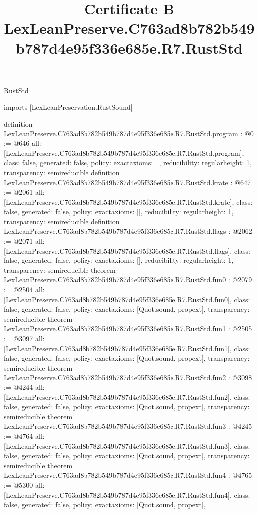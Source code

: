 \begin{lexlean}{RustStd}
\title{Certificate B LexLeanPreserve.C763ad8b782b549b787d4e95f336e685e.R7.RustStd}
\begin{coremodule}
imports [LexLeanPreservation.RustSound]

definition LexLeanPreserve.C763ad8b782b549b787d4e95f336e685e.R7.RustStd.program : @0 := @646 {
  all: [LexLeanPreserve.C763ad8b782b549b787d4e95f336e685e.R7.RustStd.program],
  class: false,
  generated: false,
  policy: exact{axioms: []},
  reducibility: regular{height: 1},
  transparency: semireducible
}
definition LexLeanPreserve.C763ad8b782b549b787d4e95f336e685e.R7.RustStd.krate : @647 := @2061 {
  all: [LexLeanPreserve.C763ad8b782b549b787d4e95f336e685e.R7.RustStd.krate],
  class: false,
  generated: false,
  policy: exact{axioms: []},
  reducibility: regular{height: 1},
  transparency: semireducible
}
definition LexLeanPreserve.C763ad8b782b549b787d4e95f336e685e.R7.RustStd.flags : @2062 := @2071 {
  all: [LexLeanPreserve.C763ad8b782b549b787d4e95f336e685e.R7.RustStd.flags],
  class: false,
  generated: false,
  policy: exact{axioms: []},
  reducibility: regular{height: 1},
  transparency: semireducible
}
theorem LexLeanPreserve.C763ad8b782b549b787d4e95f336e685e.R7.RustStd.fun0 : @2079 := @2504 {
  all: [LexLeanPreserve.C763ad8b782b549b787d4e95f336e685e.R7.RustStd.fun0],
  class: false,
  generated: false,
  policy: exact{axioms: [Quot.sound, propext]},
  transparency: semireducible
}
theorem LexLeanPreserve.C763ad8b782b549b787d4e95f336e685e.R7.RustStd.fun1 : @2505 := @3097 {
  all: [LexLeanPreserve.C763ad8b782b549b787d4e95f336e685e.R7.RustStd.fun1],
  class: false,
  generated: false,
  policy: exact{axioms: [Quot.sound, propext]},
  transparency: semireducible
}
theorem LexLeanPreserve.C763ad8b782b549b787d4e95f336e685e.R7.RustStd.fun2 : @3098 := @4244 {
  all: [LexLeanPreserve.C763ad8b782b549b787d4e95f336e685e.R7.RustStd.fun2],
  class: false,
  generated: false,
  policy: exact{axioms: [Quot.sound, propext]},
  transparency: semireducible
}
theorem LexLeanPreserve.C763ad8b782b549b787d4e95f336e685e.R7.RustStd.fun3 : @4245 := @4764 {
  all: [LexLeanPreserve.C763ad8b782b549b787d4e95f336e685e.R7.RustStd.fun3],
  class: false,
  generated: false,
  policy: exact{axioms: [Quot.sound, propext]},
  transparency: semireducible
}
theorem LexLeanPreserve.C763ad8b782b549b787d4e95f336e685e.R7.RustStd.fun4 : @4765 := @5300 {
  all: [LexLeanPreserve.C763ad8b782b549b787d4e95f336e685e.R7.RustStd.fun4],
  class: false,
  generated: false,
  policy: exact{axioms: [Quot.sound, propext]},
}
\end{coremodule}
\end{lexlean}
